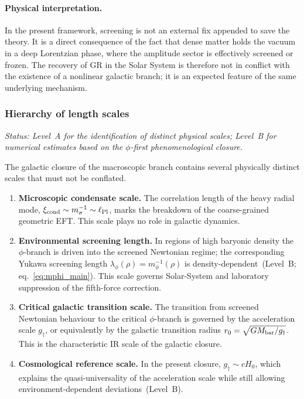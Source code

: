 \documentclass[11pt,a4paper]{article}
\numberwithin{equation}{section}
\begin{document}
\paragraph{Physical interpretation.}
In the present framework, screening is not an external fix
appended to save the theory. It is a direct consequence of the
fact that dense matter holds the vacuum in a deep Lorentzian
phase, where the amplitude sector is effectively screened or frozen.
The recovery of GR in the Solar System is therefore not in
conflict with the existence of a nonlinear galactic branch;
it is an expected feature of the same underlying mechanism.


\subsubsection*{Hierarchy of length scales}
\label{subsec:lof_scales}

\textit{Status: Level~A for the identification of distinct
physical scales; Level~B for numerical estimates based on the
$\phi$-first phenomenological closure.}

The galactic closure of the macroscopic branch contains several
physically distinct scales that must not be conflated.

\begin{enumerate}[label=(\roman*)]
  \item \textbf{Microscopic condensate scale.}
  The correlation length of the heavy radial mode,
  $\xi_{\rm cond}\sim m_\sigma^{-1}\sim\ell_{\rm Pl}$,
  marks the breakdown of the coarse-grained geometric EFT.
  This scale plays no role in galactic dynamics.

  \item \textbf{Environmental screening length.}
  In regions of high baryonic density the $\phi$-branch
  is driven into the screened Newtonian regime; the
  corresponding Yukawa screening length $\lambda_\phi(\rho)=m_\phi^{-1}(\rho)$
  is density-dependent~(Level~B; eq.~\eqref{eq:mphi_main}).
  This scale governs Solar-System and laboratory suppression
  of the fifth-force correction.

  \item \textbf{Critical galactic transition scale.}
  The transition from screened Newtonian behaviour to the
  critical $\phi$-branch is governed by the acceleration scale
  $g_\dagger$, or equivalently by the galactic transition
  radius $r_0=\sqrt{GM_{\rm bar}/g_\dagger}$.
  This is the characteristic IR scale of the galactic closure.

  \item \textbf{Cosmological reference scale.}
  In the present closure, $g_\dagger\sim cH_0$, which explains
  the quasi-universality of the acceleration scale while still
  allowing environment-dependent deviations~(Level~B).
\end{enumerate}
\end{document}
